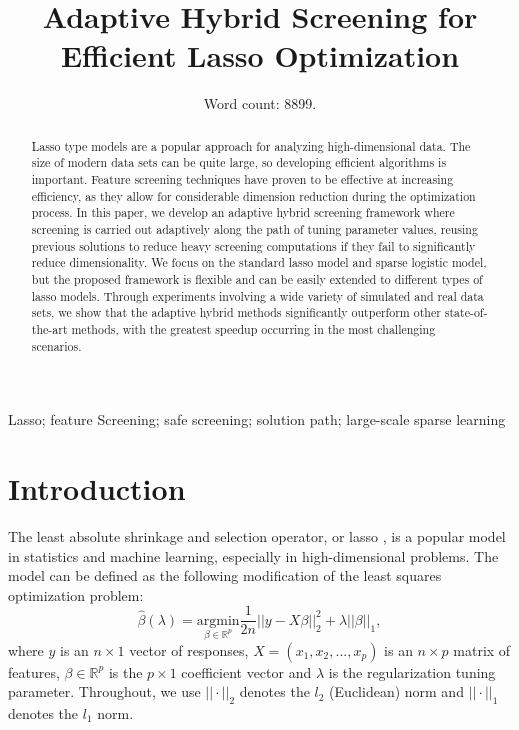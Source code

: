 \documentclass[]{interact}
\title{Adaptive Hybrid Screening for Efficient Lasso Optimization}
\author{Word count: 8899.}
\date{}
\theoremstyle{plain}%
\theoremstyle{definition}
\theoremstyle{remark}
\begin{document}
\maketitle


\begin{abstract}
Lasso type models are a popular approach for analyzing high-dimensional data. The size of modern data sets can be quite large, so developing efficient algorithms is important. Feature screening techniques have proven to be effective at increasing efficiency, as they allow for considerable dimension reduction during the optimization process. In this paper, we develop an adaptive hybrid screening framework where screening is carried out adaptively along the path of tuning parameter values, reusing previous solutions to reduce heavy screening computations if they fail to significantly reduce dimensionality. We focus on the standard lasso model and sparse logistic model, but the proposed framework is flexible and can be easily extended to different types of lasso models. Through experiments involving a wide variety of simulated and real data sets, we show that the adaptive hybrid methods significantly outperform other state-of-the-art methods, with the greatest speedup occurring in the most challenging scenarios.
\end{abstract}

\begin{keywords}
Lasso; feature Screening; safe screening; solution path; large-scale sparse learning
\end{keywords}

\section{Introduction}

The least absolute shrinkage and selection operator, or lasso \citep{tibshirani1996regression}, is a popular model in statistics and machine learning, especially in high-dimensional problems. The model can be defined as the following modification of the least squares optimization problem:
\begin{equation}
  \label{eq:lasso}
  \hat{\beta}(\lambda)=\underset{\beta\in \mathbb{R}^p}{\mathrm{argmin}}\frac{1}{2n}||y-X\beta||_2^2+\lambda||\beta||_1,
\end{equation}
where $y$ is an $n\times 1$ vector of responses, $X=(x_1,x_2,...,x_p)$ is an $n\times p$ matrix of features, $\beta\in \mathbb{R}^p$ is the $p\times 1$ coefficient vector and $\lambda$ is the regularization tuning parameter. Throughout, we use $||\cdot||_2$ denotes the $l_2$ (Euclidean) norm and $||\cdot||_1$ denotes the $l_1$ norm. 
\end{document}
